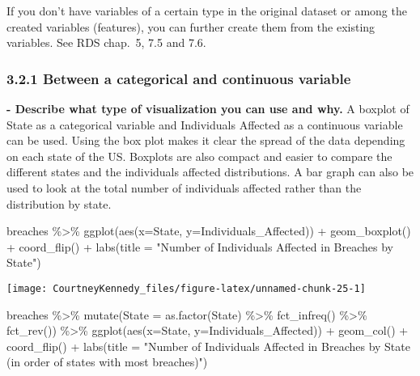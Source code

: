\documentclass[
]{article}
\newenvironment{Shaded}{\begin{snugshade}}{\end{snugshade}}
\newcommand{\AttributeTok}[1]{\textcolor[rgb]{0.77,0.63,0.00}{#1}}
\newcommand{\FunctionTok}[1]{\textcolor[rgb]{0.00,0.00,0.00}{#1}}
\newcommand{\NormalTok}[1]{#1}
\newcommand{\SpecialCharTok}[1]{\textcolor[rgb]{0.00,0.00,0.00}{#1}}
\newcommand{\StringTok}[1]{\textcolor[rgb]{0.31,0.60,0.02}{#1}}
\begin{document}
If you don't have variables of a certain type in the original dataset or
among the created variables (features), you can further create them from
the existing variables. See RDS chap.~5, 7.5 and 7.6.

\hypertarget{between-a-categorical-and-continuous-variable}{%
\subsubsection{3.2.1 Between a categorical and continuous
variable}\label{between-a-categorical-and-continuous-variable}}

\textbf{- Describe what type of visualization you can use and why.} A
boxplot of State as a categorical variable and Individuals Affected as a
continuous variable can be used. Using the box plot makes it clear the
spread of the data depending on each state of the US. Boxplots are also
compact and easier to compare the different states and the individuals
affected distributions. A bar graph can also be used to look at the
total number of individuals affected rather than the distribution by
state.

\begin{Shaded}
\begin{Highlighting}[]
\NormalTok{breaches }\SpecialCharTok{\%\textgreater{}\%}
  \FunctionTok{ggplot}\NormalTok{(}\FunctionTok{aes}\NormalTok{(}\AttributeTok{x=}\NormalTok{State, }\AttributeTok{y=}\NormalTok{Individuals\_Affected)) }\SpecialCharTok{+}
  \FunctionTok{geom\_boxplot}\NormalTok{() }\SpecialCharTok{+}
  \FunctionTok{coord\_flip}\NormalTok{() }\SpecialCharTok{+}
  \FunctionTok{labs}\NormalTok{(}\AttributeTok{title =} \StringTok{"Number of Individuals Affected in Breaches by State"}\NormalTok{)}
\end{Highlighting}
\end{Shaded}

\begin{center}\texttt{[image: CourtneyKennedy\_files/figure-latex/unnamed-chunk-25-1]} \end{center}

\begin{Shaded}
\begin{Highlighting}[]
\NormalTok{breaches }\SpecialCharTok{\%\textgreater{}\%}
  \FunctionTok{mutate}\NormalTok{(}\AttributeTok{State =} \FunctionTok{as.factor}\NormalTok{(State) }\SpecialCharTok{\%\textgreater{}\%} \FunctionTok{fct\_infreq}\NormalTok{() }\SpecialCharTok{\%\textgreater{}\%} \FunctionTok{fct\_rev}\NormalTok{()) }\SpecialCharTok{\%\textgreater{}\%}
  \FunctionTok{ggplot}\NormalTok{(}\FunctionTok{aes}\NormalTok{(}\AttributeTok{x=}\NormalTok{State, }\AttributeTok{y=}\NormalTok{Individuals\_Affected)) }\SpecialCharTok{+}
  \FunctionTok{geom\_col}\NormalTok{() }\SpecialCharTok{+}
  \FunctionTok{coord\_flip}\NormalTok{() }\SpecialCharTok{+}
  \FunctionTok{labs}\NormalTok{(}\AttributeTok{title =} \StringTok{"Number of Individuals Affected in Breaches by State }
\StringTok{       (in order of states with most breaches)"}\NormalTok{)}
\end{Highlighting}
\end{Shaded}
\end{document}
